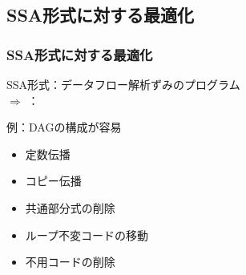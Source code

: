 \documentclass[ckj,dvipdfmx]{beamer}
\begin{document}
\subsection{SSA形式に対する最適化}

\begin{frame}
  \frametitle{SSA形式に対する最適化}
  SSA形式：データフロー解析ずみのプログラム\\[2zw]

  $\Rightarrow$
  ：

  例：DAGの構成が容易

  \vspace*{1zw}

  \begin{itemize}
    \item 定数伝播
    \item コピー伝播
    \item 共通部分式の削除
    \item ループ不変コードの移動
    \item 不用コードの削除
  \end{itemize}
\end{frame}
\end{document}
